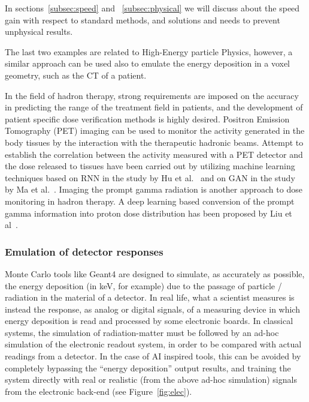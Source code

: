 In sections~\ref{subsec:speed} and ~\ref{subsec:physical} we will discuss about the speed gain with respect to standard methods, and solutions and needs to prevent unphysical results.

The last two examples are related to High-Energy particle Physics, however, a similar approach can be used also to emulate the energy deposition in a voxel geometry, such as the CT of a patient.

In the field of hadron therapy, strong requirements are imposed on the accuracy in predicting the range of the treatment field in patients, and the development of patient specific dose verification methods is highly desired. Positron Emission Tomography (PET) imaging can be used to monitor the activity generated in the body tissues by the interaction with the therapeutic hadronic beams. Attempt to establish the correlation between the activity measured with a PET detector and the dose released to tissues have been carried out by utilizing  machine learning techniques based on RNN in the study by Hu et al.~\cite{Hu2020} and on GAN in the study by Ma et al.~\cite{Ma2020c}. Imaging the prompt gamma radiation is another approach to dose monitoring in hadron therapy. A deep learning based conversion of the prompt gamma information into proton dose distribution has been proposed by Liu et al~\cite{Liu2020a}. 


\subsubsection{Emulation of detector responses}
Monte Carlo tools like Geant4 are designed to simulate, as accurately as possible, the energy deposition (in keV, for example) due to the passage of particle / radiation in the material of a detector. In real life, what a scientist measures is instead the response, as analog or digital signals, of a measuring device in which energy deposition is read and processed by some electronic boards. In classical systems, the simulation of radiation-matter must be followed by an ad-hoc simulation of the electronic readout system, in order to be compared with actual readings from a detector. In the case of AI inspired tools, this can be avoided by completely bypassing the ``energy deposition'' output results, and training the system directly with real or realistic (from the above ad-hoc simulation) signals from the electronic back-end  (see Figure~\ref{fig:elec}).

